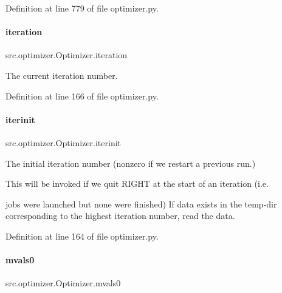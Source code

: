 Definition at line 779 of file optimizer.\+py.

\mbox{\label{classsrc_1_1optimizer_1_1Optimizer_adddc631b1dc8efe874323c3d0c7b7b2f}} 
\paragraph{\texorpdfstring{iteration}{iteration}}
{\footnotesize\ttfamily src.\+optimizer.\+Optimizer.\+iteration}



The current iteration number. 



Definition at line 166 of file optimizer.\+py.

\mbox{\label{classsrc_1_1optimizer_1_1Optimizer_ac7f1840fe54ce8f959a27f02ebccd406}} 
\paragraph{\texorpdfstring{iterinit}{iterinit}}
{\footnotesize\ttfamily src.\+optimizer.\+Optimizer.\+iterinit}



The initial iteration number (nonzero if we restart a previous run.) 

This will be invoked if we quit R\+I\+G\+HT at the start of an iteration (i.\+e.

jobs were launched but none were finished) If data exists in the temp-\/dir corresponding to the highest iteration number, read the data. 

Definition at line 164 of file optimizer.\+py.

\mbox{\label{classsrc_1_1optimizer_1_1Optimizer_a05096b5b576287250088e3883597fd09}} 
\paragraph{\texorpdfstring{mvals0}{mvals0}}
{\footnotesize\ttfamily src.\+optimizer.\+Optimizer.\+mvals0}



